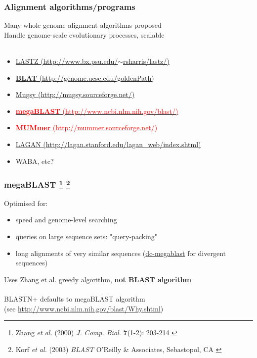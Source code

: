 %
\begin{frame}
  \frametitle{Alignment algorithms/programs}
  \textcolor{hutton_green}{Many whole-genome alignment algorithms proposed} \\
  Handle genome-scale evolutionary processes, scalable \\~\\
  \begin{itemize}
    \item \href{http://www.bx.psu.edu/~rsharris/lastz/}{LASTZ (http://www.bx.psu.edu/$\sim$rsharris/lastz/)}
    \item \href{http://genome.ucsc.edu/goldenPath/help/blatSpec.html}{\textcolor{hutton_blue}{\textbf{BLAT} (http://genome.ucsc.edu/goldenPath)}}
    \item \href{http://mugsy.sourceforge.net/}{Mugsy (http://mugsy.sourceforge.net/)}
    \item \href{http://www.ncbi.nlm.nih.gov/blast/html/megablast.html}{\textcolor{red}{\textbf{megaBLAST} (http://www.ncbi.nlm.nih.gov/blast/)}}
    \item \href{http://mummer.sourceforge.net/}{\textcolor{red}{\textbf{MUMmer} (http://mummer.sourceforge.net/)}}
    \item \href{http://lagan.stanford.edu/lagan_web/index.shtml}{{\textcolor{hutton_blue}{LAGAN (http://lagan.stanford.edu/lagan\_web/index.shtml)}}}
    \item WABA, etc?
  \end{itemize}
\end{frame}

%
\begin{frame}
  \frametitle{megaBLAST
  \footnote{\tiny{Zhang \textit{et al.} (2000) \textit{J. Comp. Biol.} \textbf{7}(1-2): 203-214
}}
  \footnote{\tiny{Korf \textit{et al.} (2003) \textit{BLAST} O'Reilly \& Associates, Sebastopol, CA
}}
  }
  Optimised for:
  \begin{itemize}
    \item \textcolor{hutton_green}{speed and genome-level searching}
    \item \textcolor{hutton_blue}{queries on large sequence sets}: "query-packing"
    \item \textcolor{hutton_purple}{long alignments of very similar sequences} (\url{dc-megablast} for divergent sequences)
  \end{itemize}
  Uses Zhang et al. greedy algorithm, \textbf{not BLAST algorithm} \\~\\
  \textcolor{RawSienna}{BLASTN+ defaults to megaBLAST algorithm} \\
  (see \href{http://www.ncbi.nlm.nih.gov/blast/Why.shtml}{http://www.ncbi.nlm.nih.gov/blast/Why.shtml})
\end{frame}

